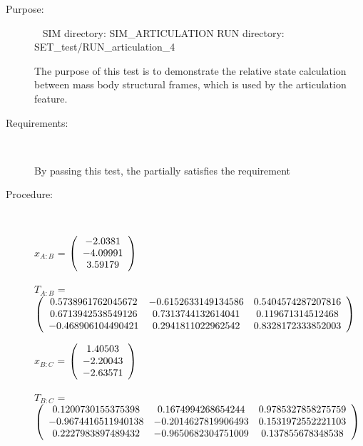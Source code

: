 \begin{description}

\item[Purpose:] \ \newline
SIM directory: SIM\_ARTICULATION
RUN directory: SET\_test/RUN\_articulation\_4

The purpose of this test is to demonstrate the relative state calculation
between mass body structural frames, which is used by the articulation
feature.

\item[Requirements:] \ \newline

By passing this test, the \ModelDesc partially satisfies
the requirement 

\item[Procedure:] \ \newline

$x_{A:B}$ = $\left( \begin{array} {ccc}    -2.0381 \\   -4.09991 \\    3.59179 
\end{array} \right)\\ \\$

$T_{A:B}$ = $\left( \begin{array} {ccc} 
   0.5738961762045672 & -0.6152633149134586 & 0.5404574287207816 \\ 
   0.6713942538549126 & 0.7313744132614041 & 0.119671314512468 \\ 
   -0.468906104490421 & 0.2941811022962542 & 0.8328172333852003 \\
\end{array} \right)\\ \\$

$x_{B:C}$ = $\left( \begin{array} {ccc}    1.40503 \\   -2.20043 \\   -2.63571 
\end{array} \right)\\ \\$

$T_{B:C}$ = $\left( \begin{array} {ccc} 
   0.1200730155375398 & 0.1674994268654244 & 0.9785327858275759 \\ 
   -0.9674416511940138 & -0.2014627819906493 & 0.1531972552221103 \\ 
   0.2227983897489432 & -0.9650682304751009 & 0.137855678348538 \\
\end{array} \right)\\ \\$


\end{description}
